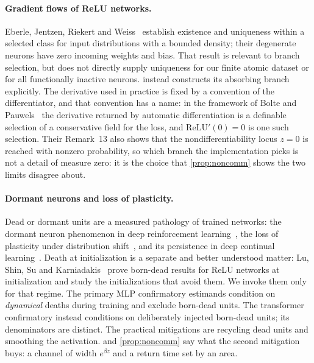 \documentclass[11pt]{article}
\theoremstyle{definition}
\theoremstyle{remark}
\begin{document}
\paragraph{Gradient flows of ReLU networks.} Eberle, Jentzen, Riekert and
Weiss~\cite{EJRW23} establish existence and uniqueness within a selected class
for input distributions with a bounded density; their degenerate neurons have
zero incoming weights and bias. That result is relevant to branch selection,
but does not directly supply uniqueness for our finite atomic dataset or for
all functionally inactive neurons.  instead constructs its
absorbing branch explicitly. The derivative used in practice is fixed by a
convention of the differentiator, and that
convention has a name: in the framework of Bolte and Pauwels~\cite{BP21} the
derivative returned by automatic differentiation is a definable selection of a
conservative field for the loss, and $\mathrm{ReLU}'(0)=0$ is one such
selection. Their Remark~13 also shows that the nondifferentiability locus
$z=0$ is reached with nonzero probability, so which branch the implementation
picks is not a detail of measure zero: it is the choice that
\cref{prop:noncomm} shows the two limits disagree about.

\paragraph{Dormant neurons and loss of plasticity.} Dead or dormant units are
a measured pathology of trained networks: the dormant neuron phenomenon in
deep reinforcement learning~\cite{Sokar23}, the loss of plasticity under
distribution shift~\cite{Lyle23}, and its persistence in deep continual
learning~\cite{Dohare24}. Death at initialization is a separate and better
understood matter: Lu, Shin, Su and Karniadakis~\cite{Lu20} prove born-dead
results for ReLU networks at initialization and study the initializations that
avoid them. We invoke them only for that regime. The primary MLP
confirmatory estimands condition on \emph{dynamical} deaths during training
and exclude born-dead units. The transformer confirmatory instead conditions
on deliberately injected born-dead units; its denominators are distinct. The practical
mitigations are recycling dead units and smoothing the activation.
 and \cref{prop:noncomm} say what the second mitigation buys: a
channel of width $e^{\beta z}$ and a return time set by an area.
\end{document}
